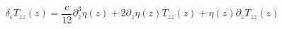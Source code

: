 \begin{equation}
    \label{eqn:central-charge-transformation-eqn}
    \delta_{\epsilon}T_{zz}(z) = \frac{c}{12}\partial^3_z\eta(z) + 2\partial_z\eta(z)T_{zz}(z) + \eta(z)\partial_zT_{zz}(z)
\end{equation}



%
%
